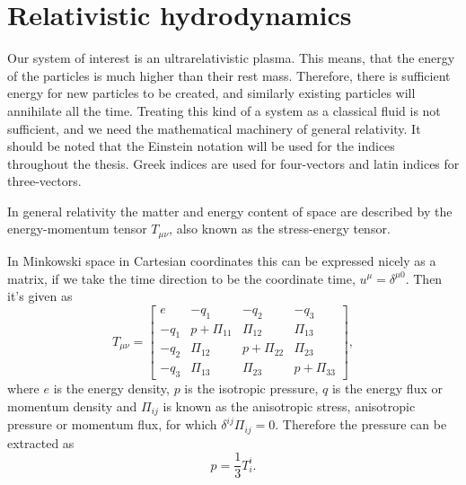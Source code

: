 \section{Relativistic hydrodynamics}
\label{rel_hydro}

Our system of interest is an ultrarelativistic plasma.
This means, that the energy of the particles is much higher than their rest mass.
Therefore, there is sufficient energy for new particles to be created,
and similarly existing particles will annihilate all the time.
Treating this kind of a system as a classical fluid is not sufficient,
and we need the mathematical machinery of general relativity.
It should be noted that the Einstein notation will be used for the indices throughout the thesis.
Greek indices are used for four-vectors and latin indices for three-vectors.

In general relativity the matter and energy content of space are described by the energy-momentum tensor $T_{\mu \nu}$, also known as the stress-energy tensor.

In Minkowski space in Cartesian coordinates this can be expressed nicely as a matrix,
if we take the time direction to be the coordinate time, $u^\mu = \delta^{\mu 0}$.
Then it's given as
\cites[eq. 4.17]{rasanen_gr_2022}[fig. 3.3]{rezzolla_relativistic_2013}
\begin{equation}
T_{\mu \nu} =
\begin{bmatrix}
e & -q_1 & -q_2 & -q_3 \\
-q_1 & p + \Pi_{11} & \Pi_{12} & \Pi_{13} \\
-q_2 & \Pi_{12} & p + \Pi_{22} & \Pi_{23} \\
-q_3 & \Pi_{13} & \Pi_{23} & p + \Pi_{33}
\end{bmatrix},
\label{eq:ep_tensor_general_matrix}
\end{equation}
where $e$ is the energy density, $p$ is the isotropic pressure, $q$ is the energy flux or momentum density and
$\Pi_{ij}$ is known as the anisotropic stress, anisotropic pressure or momentum flux,
for which $\delta^{ij} \Pi_{ij} = 0$.
Therefore the pressure can be extracted as
\begin{equation}
p = \frac{1}{3} T^i_i.
\label{eq:pressure_from_ep_tensor}
\end{equation}

